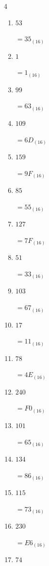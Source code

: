\begin{multicols}{4}
\begin{enumerate}
  \item $53$

        $=35_{(16)}$

  \item $1$

        $=1_{(16)}$

  \item $99$

        $=63_{(16)}$

  \item $109$

        $=6D_{(16)}$

  \item $159$

        $=9F_{(16)}$

  \item $85$

        $=55_{(16)}$

  \item $127$

        $=7F_{(16)}$

  \item $51$

        $=33_{(16)}$

  \item $103$

        $=67_{(16)}$

  \item $17$

        $=11_{(16)}$

\columnbreak %

  \item $78$

        $=4E_{(16)}$

  \item $240$

        $=F0_{(16)}$

  \item $101$

        $=65_{(16)}$

  \item $134$

        $=86_{(16)}$

  \item $115$

        $=73_{(16)}$

  \item $230$

        $=E6_{(16)}$

  \item $74$


\end{enumerate}
\end{multicols}
